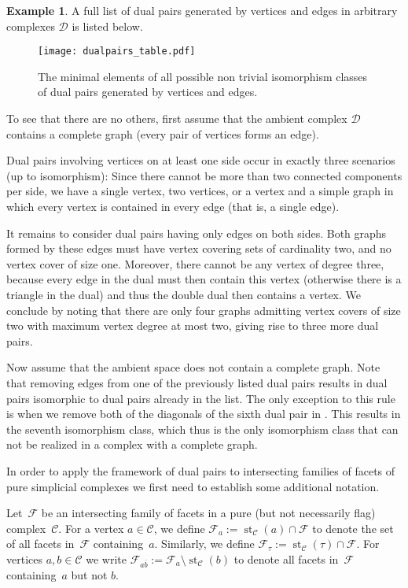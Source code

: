 \documentclass[a4paper,12pt]{amsart}
\theoremstyle{plain}
\theoremstyle{definition}
\newtheorem{example}[theorem]{Example}
\newcommand{\C}{\mathcal C}
\newcommand{\D}{\mathcal D}
\newcommand{\family}{\mathcal F}
\newcommand{\smallface}{\tau}
\DeclareMathOperator{\st}{st}
\begin{document}
\begin{example}
  \label{ex:dual3}
  A full list of dual pairs generated by vertices and edges in arbitrary complexes $\D$ is listed below.

  \begin{figure}[ht]
    \texttt{[image: dualpairs\_table.pdf]}
    \caption{The minimal elements of all possible non trivial isomorphism classes of dual pairs generated by vertices and edges.\label{fig:dualpairs}}
  \end{figure}


  To see that there are no others, first assume that the ambient complex $\D$ contains a complete graph (every pair of vertices forms an edge).

  Dual pairs involving vertices on at least one side occur in exactly three scenarios (up to isomorphism): Since there cannot be more than two connected components per side, we have a single vertex, two vertices, or a vertex and a simple graph in which every vertex is contained in every edge (that is, a single edge).

  It remains to consider dual pairs having only edges on both sides. Both graphs formed by these edges must have vertex covering sets of cardinality two, and no vertex cover of size one. Moreover, there cannot be any vertex of degree three, because every edge in the dual must then contain this vertex (otherwise there is a triangle in the dual) and thus the double dual then contains a vertex. We conclude by noting that there are only four graphs admitting vertex covers of size two with maximum vertex degree at most two, giving rise to three more dual pairs.

  Now assume that the ambient space does not contain a complete graph. Note that removing edges from one of the previously listed dual pairs results in dual pairs isomorphic to dual pairs already in the list. The only exception to this rule is when we remove both of the diagonals of the sixth dual pair in . This results in the seventh isomorphism class, which thus is the only isomorphism class that can not be realized in a complex with a complete graph.
\end{example}

In order to apply the framework of dual pairs to intersecting families of facets of pure simplicial complexes we first need to establish some additional notation.

Let~$\family$ be an intersecting family of facets in a pure (but not necessarily flag) complex~$\C$.
For a vertex $a \in \C$, we define $\family_a := \st_\C (a) \cap \family$ to denote the set of all facets in~$\family$ containing~$a$. Similarly, we define $\family_\smallface := \st_\C (\smallface) \cap \family $. For vertices $a,b \in \C$ we write
$\family_{a\overline b} := \family_a \setminus \st_\C (b)$ to denote all facets in~$\family$ containing~$a$ but not $b$. 
\end{document}
